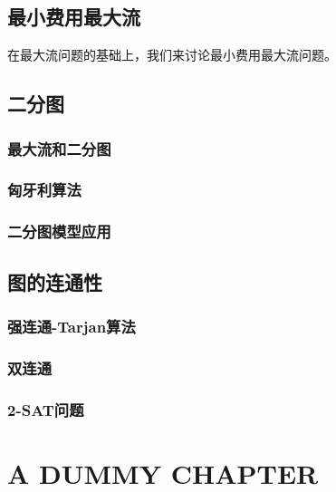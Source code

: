\documentclass[a4paper]{ctexbook}
\begin{document}
  \section{最小费用最大流}
  在最大流问题的基础上，我们来讨论最小费用最大流问题。
  \section{二分图}
  \subsection{最大流和二分图}
  \subsection{匈牙利算法}
  \subsection{二分图模型应用}
  \section{图的连通性}
  \subsection{强连通-Tarjan算法}
  \subsection{双连通}
  \subsection{2-SAT问题}
  \chapter{A DUMMY CHAPTER}
\end{document}
